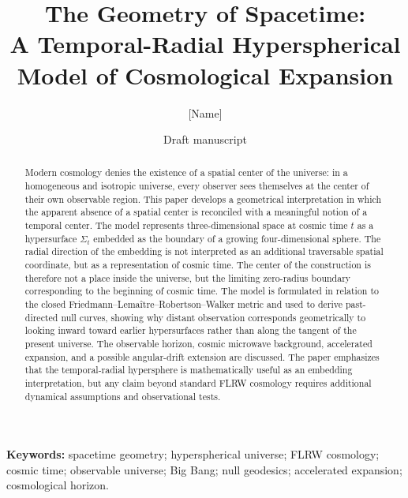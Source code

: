 \documentclass[11pt]{article}
\title{The Geometry of Spacetime:\\
A Temporal-Radial Hyperspherical Model of Cosmological Expansion}
\author{[Name]}
\date{Draft manuscript}
\begin{document}
\maketitle

\begin{abstract}
Modern cosmology denies the existence of a spatial center of the universe: in a homogeneous and isotropic universe, every observer sees themselves at the center of their own observable region. This paper develops a geometrical interpretation in which the apparent absence of a spatial center is reconciled with a meaningful notion of a temporal center. The model represents three-dimensional space at cosmic time $t$ as a hypersurface $\Sigma_t$ embedded as the boundary of a growing four-dimensional sphere. The radial direction of the embedding is not interpreted as an additional traversable spatial coordinate, but as a representation of cosmic time. The center of the construction is therefore not a place inside the universe, but the limiting zero-radius boundary corresponding to the beginning of cosmic time. The model is formulated in relation to the closed Friedmann--Lema\^itre--Robertson--Walker metric and used to derive past-directed null curves, showing why distant observation corresponds geometrically to looking inward toward earlier hypersurfaces rather than along the tangent of the present universe. The observable horizon, cosmic microwave background, accelerated expansion, and a possible angular-drift extension are discussed. The paper emphasizes that the temporal-radial hypersphere is mathematically useful as an embedding interpretation, but any claim beyond standard FLRW cosmology requires additional dynamical assumptions and observational tests.
\end{abstract}

\noindent\textbf{Keywords:} spacetime geometry; hyperspherical universe; FLRW cosmology; cosmic time; observable universe; Big Bang; null geodesics; accelerated expansion; cosmological horizon.





\end{document}
